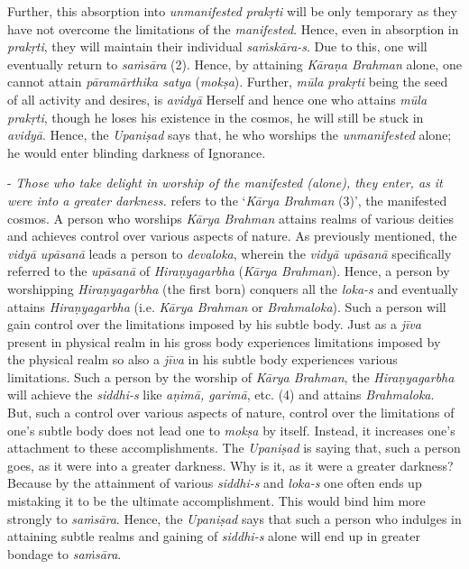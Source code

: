 Further, this absorption into \emph{unmanifested} \emph{prakṛti} will be only temporary as they have not overcome the limitations of the \emph{manifested}. Hence, even in absorption in \emph{prakṛti}, they will maintain their individual \emph{saṁskāra-s}. Due to this, one will eventually return to \emph{saṁsāra} (2). Hence, by attaining \emph{Kāraṇa Brahman} alone, one cannot attain \emph{pāramārthika satya} (\emph{mokṣa}). Further, \emph{mūla prakṛti} being the seed of all activity and desires, is \emph{avidyā} Herself and hence one who attains \emph{mūla prakṛti}, though he loses his existence in the cosmos, he will still be stuck in \emph{avidyā}. Hence, the \emph{Upaniṣad} says that, he who worships the \emph{unmanifested} alone; he would enter blinding darkness of Ignorance.

- \emph{Those who take delight in worship of the manifested (alone), they enter, as it were into a greater darkness.}  refers to the `\emph{Kārya Brahman} (3)', the manifested cosmos. A person who worships \emph{Kārya Brahman} attains realms of various deities and achieves control over various aspects of nature. As previously mentioned, the \emph{vidyā upāsanā} leads a person to \emph{devaloka}, wherein the \emph{vidyā upāsanā} specifically referred to the \emph{upāsanā} of \emph{Hiraṇyagarbha} (\emph{Kārya Brahman}). Hence, a person by worshipping \emph{Hiraṇyagarbha} (the first born) conquers all the \emph{loka-s} and eventually attains \emph{Hiraṇyagarbha} (i.e. \emph{Kārya Brahman} or \emph{Brahmaloka}). Such a person will gain control over the limitations imposed by his subtle body. Just as a \emph{jīva} present in physical realm in his gross body experiences limitations imposed by the physical realm so also a \emph{jīva} in his subtle body experiences various limitations. Such a person by the worship of \emph{Kārya Brahman}, the \emph{Hiraṇyagarbha} will achieve the \emph{siddhi-s} like \emph{aṇimā, garimā}, etc. (4) and attains \emph{Brahmaloka}. But, such a control over various aspects of nature, control over the limitations of one's subtle body does not lead one to \emph{mokṣa} by itself. Instead, it increases one's attachment to these accomplishments. The \emph{Upaniṣad} is saying that, such a person goes, as it were into a greater darkness. Why is it, as it were a greater darkness? Because by the attainment of various \emph{siddhi-s} and \emph{loka-s} one often ends up mistaking it to be the ultimate accomplishment. This would bind him more strongly to \emph{saṁsāra}. Hence, the \emph{Upaniṣad} says that such a person who indulges in attaining subtle realms and gaining of \emph{siddhi-s} alone will end up in greater bondage to \emph{saṁsāra}.

